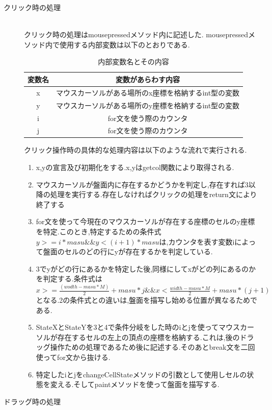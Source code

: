 \documentclass[dvipdfmx]{jarticle}
\begin{document}
\begin{description}
    \item [クリック時の処理]\mbox{}\\
    クリック時の処理はmousepressedメソッド内に記述した.
    mousepressedメソッド内で使用する内部変数は以下のとおりである.
    \begin{table}[h]
        \centering
        \begin{tabular}{|c||c|}
            \hline
            変数名 & 変数があらわす内容\\\hline\hline
            x & マウスカーソルがある場所のx座標を格納するint型の変数\\\hline
            y & マウスカーソルがある場所のy座標を格納するint型の変数\\\hline
            i &for文を使う際のカウンタ\\\hline
            j &for文を使う際のカウンタ \\\hline
        \end{tabular}
        \caption{内部変数名とその内容}
    \end{table}
    クリック操作時の具体的な処理内容は以下のような流れで実行される.
    \begin{enumerate}
        \item x,yの宣言及び初期化をする.x,yはgetcol関数により取得される.
        \item マウスカーソルが盤面内に存在するかどうかを判定し,存在すれば3以降の処理を実行する.存在しなければクリックの処理をreturn文により終了する
        \item for文を使って今現在のマウスカーソルが存在する座標のセルのy座標を特定.このとき,特定するための条件式$y>=i*masu \&\& y<(i+1)*masu$は,カウンタを表す変数iによって盤面のセルのどの行にyが存在するかを判定している.
        \item 3でyがどの行にあるかを特定した後,同様にしてxがどの列にあるのかを判定する.条件式は$x>=\frac{(wodth-masu*M)}{2}+masu*j\&\& x<\frac{width-masu*M}{2}+masu*(j+1)$となる.2の条件式との違いは,盤面を描写し始める位置が異なるためである.
        \item StateXとStateYを3と4で条件分岐をした時のiとjを使ってマウスカーソルが存在するセルの左上の頂点の座標を格納する.これは,後のドラッグ操作ための処理であるため後に記述する.そのあとbreak文を二回使ってfor文から抜ける.
        \item 特定したiとjをchangeCellStateメソッドの引数として使用しセルの状態を変える.そしてpaintメソッドを使って盤面を描写する.
    \end{enumerate}
    \item [ドラッグ時の処理]\mbox{}\\

\end{description}
\end{document}
